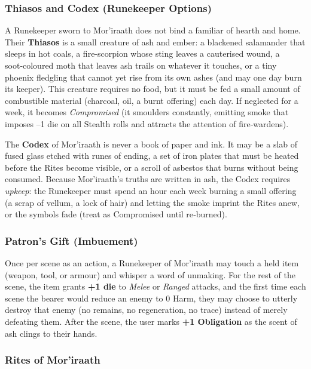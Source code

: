 \subsubsection*{Thiasos and Codex (Runekeeper Options)}
A Runekeeper sworn to Mor'iraath does not bind a familiar of hearth and home. Their \textbf{Thiasos} is a small creature of ash and ember: a blackened salamander that sleeps in hot coals, a fire‑scorpion whose sting leaves a cauterised wound, a soot‑coloured moth that leaves ash trails on whatever it touches, or a tiny phoenix fledgling that cannot yet rise from its own ashes (and may one day burn its keeper). This creature requires no food, but it must be fed a small amount of combustible material (charcoal, oil, a burnt offering) each day. If neglected for a week, it becomes \textit{Compromised} (it smoulders constantly, emitting smoke that imposes –1 die on all Stealth rolls and attracts the attention of fire‑wardens).

The \textbf{Codex} of Mor'iraath is never a book of paper and ink. It may be a slab of fused glass etched with runes of ending, a set of iron plates that must be heated before the Rites become visible, or a scroll of asbestos that burns without being consumed. Because Mor'iraath’s truths are written in ash, the Codex requires \textit{upkeep}: the Runekeeper must spend an hour each week burning a small offering (a scrap of vellum, a lock of hair) and letting the smoke imprint the Rites anew, or the symbols fade (treat as Compromised until re‑burned).

\subsubsection*{Patron's Gift (Imbuement)}
Once per scene as an action, a Runekeeper of Mor'iraath may touch a held item (weapon, tool, or armour) and whisper a word of unmaking. For the rest of the scene, the item grants \textbf{+1 die} to \textit{Melee} or \textit{Ranged} attacks, and the first time each scene the bearer would reduce an enemy to 0 Harm, they may choose to utterly destroy that enemy (no remains, no regeneration, no trace) instead of merely defeating them. After the scene, the user marks \textbf{+1 Obligation} as the scent of ash clings to their hands.

\subsubsection*{Rites of Mor'iraath}

